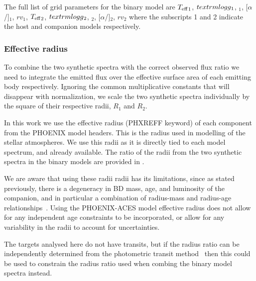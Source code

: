 {\red{} The full list of grid parameters for the binary model are \({T_{\mathrm{eff}}}_{1}\),  \(textrm{logg}{}_1\), \feh{}\(_1\), [\(\alpha\)/]\(_1\), \({rv}_1\), \({T_{\mathrm{eff}}}_{2}\), \(textrm{logg}{}_2\), \feh{}\(_2\), [\(\alpha\)/]\(_2\), \({rv}_2\) where the subscripts 1 and 2 indicate the host and companion models respectively.}






\subsubsection{Effective radius}
\label{subsection-radius}

To combine the two synthetic spectra with the correct observed flux ratio we need to integrate the emitted flux over the effective surface area of each emitting body respectively. Ignoring the common multiplicative constants that will disappear with normalization, we scale the two synthetic spectra individually by the square of their respective radii, \(R_1\) and \(R_2\).

In this work we use the effective radius (PHXREFF keyword) of each component from the PHOENIX model headers. This is the radius used in modelling of the stellar atmospheres. We use this radii as it is directly tied to each model spectrum, and already available. The ratio of the radii from the two synthetic spectra in the binary models are provided in .

We are aware that using these radii radii has its limitations, since as stated previously, there is a degeneracy in {BD} mass, age, and luminosity of the companion, and in particular a combination of radius-mass and radius-age relationships~\citep{sorahana_radii_2013}. Using the {PHOENIX-ACES} model effective radius does not allow for any independent age constraints to be incorporated, or allow for any variability in the radii to account for uncertainties.

The targets analysed here do not have transits, but if the radius ratio can be independently determined from the photometric transit method~\citep{deeg_photometric_1998} then this could be used to constrain the radius ratio used when combing the binary model spectra instead.


